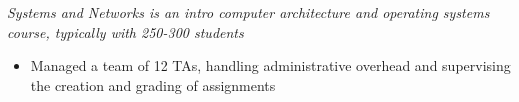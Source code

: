 \smallskip

\begin{samepage}
\newline
{}
\newline
\textit{Systems and Networks is an intro computer architecture and operating systems course, typically with 250-300 students}
\begin{itemize}[noitemsep,topsep=0pt,parsep=0pt,partopsep=0pt]
    \item Managed a team of 12 TAs, handling administrative overhead and supervising the creation and grading of assignments
\end{itemize}
\end{samepage}

